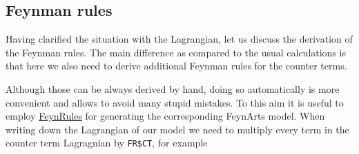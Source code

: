\documentclass[../FeynCalcManual.tex]{subfiles}
\begin{document}
\hypertarget{feynman-rules}{%
\subsection{Feynman rules}\label{feynman-rules}}

Having clarified the situation with the Lagrangian, let us discuss the
derivation of the Feynman rules. The main difference as compared to the
usual calculations is that here we also need to derive additional
Feynman rules for the counter terms.

Although those can be always derived by hand, doing so automatically is
more convenient and allows to avoid many stupid mistakes. To this aim it
is useful to employ \href{https://feynrules.irmp.ucl.ac.be/}{FeynRules}
for generating the corresponding FeynArts model. When writing down the
Lagrangian of our model we need to multiply every term in the counter
term Lagragnian by \texttt{FR\$CT}, for example

\begin{Shaded}
\begin{Highlighting}[]
\ExtensionTok{=}\SpecialCharTok{+}

\ExtensionTok{=} \SpecialCharTok{/} \OperatorTok{[}\OperatorTok{,}\OperatorTok{]} \OperatorTok{[}\OperatorTok{,}\OperatorTok{]} \SpecialCharTok{{-}} \SpecialCharTok{/}\SpecialCharTok{\^{}}\SpecialCharTok{*}\SpecialCharTok{\^{}} \SpecialCharTok{{-}} \SpecialCharTok{/}\NormalTok{(}\NormalTok{!) }\SpecialCharTok{*}\SpecialCharTok{\^{}}\NormalTok{;}
\ExtensionTok{=}  \SpecialCharTok{/}\NormalTok{) }\OperatorTok{[}\OperatorTok{,}\OperatorTok{]} \OperatorTok{[}\OperatorTok{,}\OperatorTok{]} \SpecialCharTok{{-}} \SpecialCharTok{/}\SpecialCharTok{\^{}}\NormalTok{)}\SpecialCharTok{*}\SpecialCharTok{\^{}} \SpecialCharTok{{-}} \SpecialCharTok{/}\NormalTok{(}\SpecialCharTok{\^{}}\NormalTok{)}\SpecialCharTok{*}\SpecialCharTok{*}\SpecialCharTok{\^{}}\NormalTok{;}
\end{Highlighting}
\end{Shaded}
\end{document}
